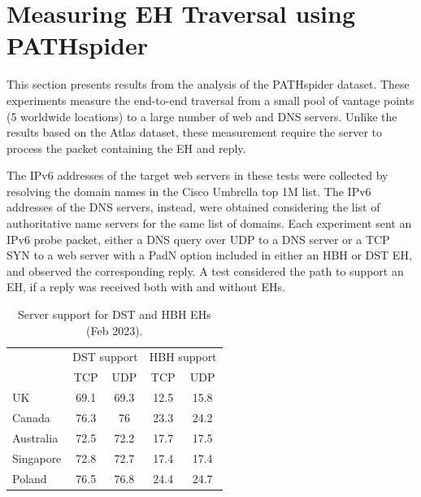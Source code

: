 \documentclass[conference]{IEEEtran}
\begin{document}
\section{Measuring EH Traversal using PATHspider} 
\label{sec:pathspider-results}

This section presents results from the analysis of the PATHspider dataset.
These experiments measure the end-to-end traversal from a small
pool of vantage points (5 worldwide locations) to a large number of web and
DNS servers.  Unlike the results based on the Atlas dataset, these
measurement require the server to process the packet containing the EH and
reply.

The IPv6 addresses of the target web servers in these tests were collected by
resolving the domain names in the Cisco Umbrella top 1M list. The IPv6
addresses of the DNS servers, instead, were obtained considering the list of
authoritative name servers for the same list of domains.
Each experiment sent an IPv6 probe packet, either a DNS
query over UDP to a DNS server or a TCP SYN to a web server with a PadN option
included in either an HBH or DST EH, and observed the
corresponding reply.  A test considered the path to support an EH, if a reply was received
both with and without EHs. 


\begin{table} 
\centering
\caption{Server support for DST and HBH EHs (Feb 2023). }
\begin{tabular}{p{1.5cm}|cc|cc}
\multicolumn{1}{l|}{} & \multicolumn{2}{p{2cm}|}{\centering DST support} 
                      & \multicolumn{2}{p{2cm}}{\centering HBH support} \\ \cline{2-5} 
\multicolumn{1}{l|}{} & \multicolumn{1}{c|}{TCP}   & UDP      & \multicolumn{1}{c|}{TCP}     & UDP   \\ \hline \hline
UK                    & \multicolumn{1}{c|}{69.1}  & 69.3     & \multicolumn{1}{c|}{12.5}    & 15.8  \\ \hline
Canada                & \multicolumn{1}{c|}{76.3}  & 76       & \multicolumn{1}{c|}{23.3}    & 24.2  \\ \hline
Australia             & \multicolumn{1}{c|}{72.5}  & 72.2     & \multicolumn{1}{c|}{17.7}    & 17.5  \\ \hline
Singapore             & \multicolumn{1}{c|}{72.8}  & 72.7     & \multicolumn{1}{c|}{17.4}    & 17.4  \\ \hline
Poland                & \multicolumn{1}{c|}{76.5}  & 76.8     & \multicolumn{1}{c|}{24.4}    & 24.7   
\end{tabular}
\label{tbl:e2e_traversal}
\end{table}
\end{document}
